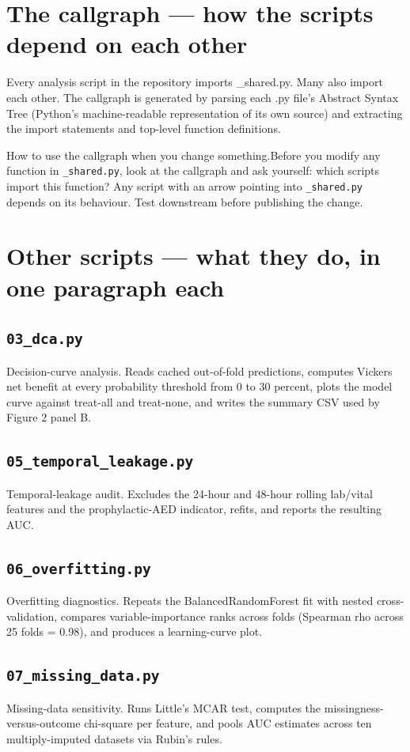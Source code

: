 \documentclass[11pt,a4paper]{article}
\begin{document}
\section{The callgraph — how the scripts depend on each other}
Every analysis script in the repository imports \_shared.py. Many also import each other. The callgraph is generated by parsing each .py file's Abstract Syntax Tree (Python's machine-readable representation of its own source) and extracting the import statements and top-level function definitions.
\begin{callout}{How to use the callgraph when you change something.}Before you modify any function in \texttt{\_shared.py}, look at the callgraph and ask yourself: which scripts import this function? Any script with an arrow pointing into \texttt{\_shared.py} depends on its behaviour. Test downstream before publishing the change.\end{callout}
\clearpage
\section{Other scripts — what they do, in one paragraph each}
\subsection{\texttt{03\_dca.py}}
Decision-curve analysis. Reads cached out-of-fold predictions, computes Vickers net benefit at every probability threshold from 0 to 30 percent, plots the model curve against treat-all and treat-none, and writes the summary CSV used by Figure 2 panel B.
\subsection{\texttt{05\_temporal\_leakage.py}}
Temporal-leakage audit. Excludes the 24-hour and 48-hour rolling lab/vital features and the prophylactic-AED indicator, refits, and reports the resulting AUC.
\subsection{\texttt{06\_overfitting.py}}
Overfitting diagnostics. Repeats the BalancedRandomForest fit with nested cross-validation, compares variable-importance ranks across folds (Spearman rho across 25 folds = 0.98), and produces a learning-curve plot.
\subsection{\texttt{07\_missing\_data.py}}
Missing-data sensitivity. Runs Little's MCAR test, computes the missingness-versus-outcome chi-square per feature, and pools AUC estimates across ten multiply-imputed datasets via Rubin's rules.
\end{document}
